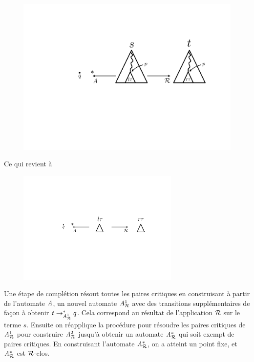 \begin{figure}[ht!]
  \centering
  \includegraphics[width=12cm]{2_prerequis/cp1}
\end{figure}
Ce qui revient à\\
\begin{figure}[ht!]
  \centering
  \includegraphics[width=8cm]{2_prerequis/cp2}
\end{figure}


Une étape de complétion résout toutes les paires critiques en construisant
à partir de l'automate $\mathit A$, un nouvel automate ${\mathit A}_{\mathcal R}^1$ avec des transitions
supplémentaires de façon à obtenir $t \rightarrow_{{\mathit A}_{\mathcal R}^1}^* q$. Cela correspond
au résultat de l'application $\mathcal R$ sur le terme $s$. Ensuite on réapplique la procédure
pour résoudre les paires critiques de ${\mathit A}_{\mathcal R}^1$ pour construire ${\mathit A}_{\mathcal R}^2$ jusqu'à obtenir
un automate ${\mathit A}_{\mathcal R}^*$ qui soit exempt de paires critiques. En construisant l'automate ${\mathit A}_{\mathcal R}^*$,
on a atteint un point fixe, et ${\mathit A}_{\mathcal R}^*$ est $\mathcal R$-clos.

